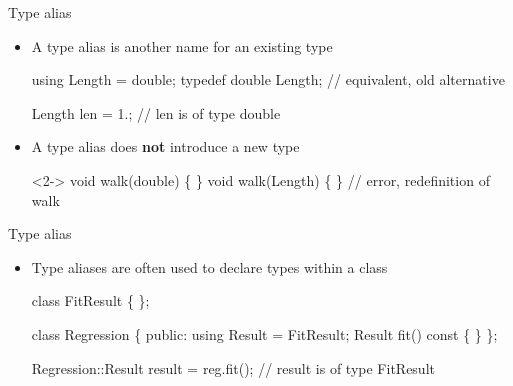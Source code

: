 \begin{frame}[fragile]{Type alias}

  \begin{itemize}
  \item A type alias is another name for an existing type

  \begin{codeblock}
using Length = double;
typedef double Length; // equivalent, old alternative

Length len = 1.; // len is of type double\end{codeblock}

  \item<2-> A type alias does \textbf{not} introduce a new type

    \begin{codeblock}<2->{
void walk(double) \{ \ddd \}
void walk(Length) \{ \ddd \} // error, redefinition of walk}\end{codeblock}

  \end{itemize}
\end{frame}

\begin{frame}[fragile]{Type alias \insertcontinuationtext}

  \begin{itemize}
  \item Type aliases are often used to declare types within a class

    \begin{codeblock}
class FitResult \{ \ddd \};

class Regression \{
  \ddd
 public:
  \alert{using Result = FitResult;}
  Result fit() const \{ \ddd \}
\};

Regression::Result result = reg.fit(); // result is of type FitResult\end{codeblock}

  \end{itemize}

\end{frame}

